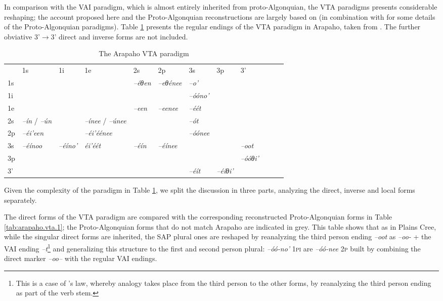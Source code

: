 \documentclass[twoside,a4paper,11pt]{article}
\newcommand{\ipa}[1]{{\phon\textit{#1}}}
\newcommand{\grise}[1]{\cellcolor{lightgray}\textbf{#1}}
\newcommand{\Σ}{\greek{Σ}}
\begin{document}
In comparison with the VAI paradigm, which is almost entirely inherited from proto-Algonquian, the VTA paradigms presents considerable reshaping; the account proposed here and the Proto-Algonquian reconstructions are largely based on  \citet[19-24]{goddard65arapaho} (in combination with  \citealt{goddard00cheyenne} for some details of the Proto-Algonquian paradigms). Table \ref{tab:arapaho.vta}   presents the regular endings of the VTA paradigm in Arapaho, taken from  \citet[487-490]{cowell06arapaho}. The  further obviative 3'$\rightarrow$3' direct and inverse forms are not included.

\begin{table}[H]
\caption{The Arapaho VTA paradigm}
\centering \label{tab:arapaho.vta}
\begin{tabular}{llllllllllll}
\toprule
 & 	1s & 	1i & 	1e & 	2s & 	2p & 	3s & 	3p & 	3' & 	\\
1s & \grise{} & 	\grise{} & 	\grise{} & 	\ipa{--éθen} & 	\ipa{--eθénee} & 	\ipa{--o'} & 	 & 	 & 	\\
1i & 	\grise{} & 	\grise{} & 	\grise{} & 	\grise{} & 	\grise{} & 	\ipa{--óóno'} & 	 & 	 & 	\\
1e & 	\grise{} & 	\grise{} & 	\grise{} & 	\ipa{--een} & 	\ipa{--eenee} & 	\ipa{--éét} & 	 & 	 & 	\\
2s & 	\ipa{--ín} / \ipa{--ún}& 	\grise{} & \ipa{--ínee} /	\ipa{--únee} & 	\grise{} & 	\grise{} & 	\ipa{--ót} & 	 & 	 & 	\\
2p & 	\ipa{--éi'een} & 	\grise{} & 	\ipa{--éi'éénee} & 	\grise{} & 	\grise{} & 	\ipa{--óónee} & 	 & 	 & 	\\
3s & 	\ipa{--éínoo} & 	\ipa{--éíno'} & 	\ipa{éi'éét} & 	\ipa{--éín} & 	\ipa{--éínee} & 	\grise{} & 	\grise{} & 	\ipa{--oot} & 	\\
3p & 	 & 	 & 	 & 	 & 	 & 	\grise{} & 	\grise{} & 	\ipa{--óóθi'} & 	\\
3' & 	 & 	 & 	 & 	 & 	 & 	\ipa{--éít} & 	\ipa{--éíθi'} &   & 	\\
\bottomrule
\end{tabular}
\end{table}

Given the complexity of the paradigm in 	Table \ref{tab:arapaho.vta}, we split the discussion  in three parts, analyzing the direct, inverse and local forms separately.

The direct forms of the VTA paradigm are compared with the corresponding reconstructed Proto-Algonquian forms in Table \ref{tab:arapaho.vta.1}; the Proto-Algonquian forms that do not match Arapaho are indicated in grey. This table shows that as in Plains Cree, while the singular direct forms are inherited, the SAP plural ones are reshaped by reanalyzing the third person ending \ipa{--oot} as \ipa{--oo-} + the VAI ending \ipa{--t}\footnote{This is a case of \citealt{watkins62celtic}'s law, whereby analogy takes place from the third person to the other forms, by reanalyzing the third person ending as part of the verb stem.} and generalizing this structure to the first and second person plural: \ipa{--óó-no'} \textsc{1pi} are \ipa{--óó-nee} \textsc{2p} built by combining the direct marker \ipa{--oo--} with the regular VAI endings.
\end{document}

